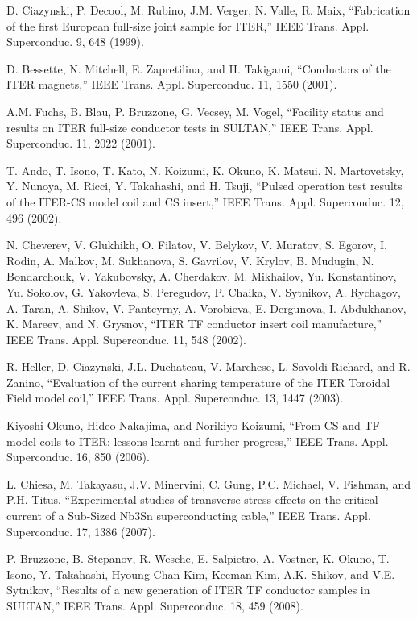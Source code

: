 \noindent [9.47] D. Ciazynski, P. Decool, M. Rubino, J.M. Verger, N. Valle, R. Maix, ``Fabrication
of the first European full-size joint sample for ITER,” IEEE Trans. Appl. Superconduc.
9, 648 (1999).

\noindent [9.48] D. Bessette, N. Mitchell, E. Zapretilina, and H. Takigami, ``Conductors of the ITER
magnets,” IEEE Trans. Appl. Superconduc. 11, 1550 (2001).

\noindent [9.49] A.M. Fuchs, B. Blau, P. Bruzzone, G. Vecsey, M. Vogel, ``Facility status and results
on ITER full-size conductor tests in SULTAN,” IEEE Trans. Appl. Superconduc.
11, 2022 (2001).

\noindent [9.50] T. Ando, T. Isono, T. Kato, N. Koizumi, K. Okuno, K. Matsui, N. Martovetsky,
Y. Nunoya, M. Ricci, Y. Takahashi, and H. Tsuji, ``Pulsed operation test results
of the ITER-CS model coil and CS insert,” IEEE Trans. Appl. Superconduc. 12,
496 (2002).

\noindent [9.51] N. Cheverev, V. Glukhikh, O. Filatov, V. Belykov, V. Muratov, S. Egorov, I. Rodin,
A. Malkov, M. Sukhanova, S. Gavrilov, V. Krylov, B. Mudugin, N. Bondarchouk,
V. Yakubovsky, A. Cherdakov, M. Mikhailov, Yu. Konstantinov, Yu. Sokolov,
G. Yakovleva, S. Peregudov, P. Chaika, V. Sytnikov, A. Rychagov, A. Taran,
A. Shikov, V. Pantcyrny, A. Vorobieva, E. Dergunova, I. Abdukhanov, K. Mareev,
and N. Grysnov, ``ITER TF conductor insert coil manufacture,” IEEE Trans. Appl.
Superconduc. 11, 548 (2002).

\noindent [9.52] R. Heller, D. Ciazynski, J.L. Duchateau, V. Marchese, L. Savoldi-Richard, and R.
Zanino, ``Evaluation of the current sharing temperature of the ITER Toroidal Field
model coil,” IEEE Trans. Appl. Superconduc. 13, 1447 (2003).

\noindent [9.53] Kiyoshi Okuno, Hideo Nakajima, and Norikiyo Koizumi, ``From CS and TF model
coils to ITER: lessons learnt and further progress,” IEEE Trans. Appl. Superconduc.
16, 850 (2006).

\noindent [9.54] L. Chiesa, M. Takayasu, J.V. Minervini, C. Gung, P.C. Michael, V. Fishman, and
P.H. Titus, ``Experimental studies of transverse stress effects on the critical current
of a Sub-Sized Nb3Sn superconducting cable,” IEEE Trans. Appl. Superconduc.
17, 1386 (2007).

\noindent [9.55] P. Bruzzone, B. Stepanov, R. Wesche, E. Salpietro, A. Vostner, K. Okuno, T. Isono,
Y. Takahashi, Hyoung Chan Kim, Keeman Kim, A.K. Shikov, and V.E. Sytnikov,
``Results of a new generation of ITER TF conductor samples in SULTAN,”
IEEE Trans. Appl. Superconduc. 18, 459 (2008).

